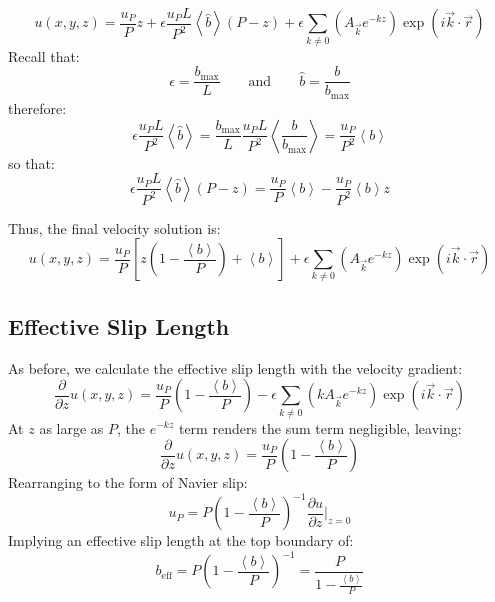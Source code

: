 \documentclass[12pt, a4paper, twoside, openright]{book}
\newcommand{\beff}{\ensuremath{b_{\mathrm{eff}}}}
\newcommand{\bmax}{\ensuremath{b_{\mathrm{max}}}}
\begin{document}
\begin{equation}
u(x,y,z) = \frac{u_P}{P} z
 + \epsilon \frac{u_P L}{P^2} \left< \hat{b} \right> (P - z)
 +  \epsilon \sum_{k \neq 0} 
\left(  A_{\vec{k}} e^{-kz} \right)
\exp(i \vec{k}\cdot \vec{r})
\end{equation}
Recall that:
\begin{equation}
\epsilon = \frac{\bmax}{L} \qquad \text{and} \qquad
\hat{b} = \frac{b}{\bmax}
\end{equation}
therefore:
\begin{equation}
\epsilon \frac{u_P L}{P^2} \left< \hat{b} \right> 
= \frac{\bmax}{L} \frac{u_P L}{P^2} \left< \frac{b}{\bmax} \right> 
= \frac{u_P}{P^2} \left< b \right>
\end{equation}
so that:
\begin{equation}
\epsilon \frac{u_P L}{P^2} \left< \hat{b} \right> (P - z)
= \frac{u_P}{P} \left< b \right> - \frac{u_P}{P^2} \left< b \right> z
\end{equation}


Thus, the final velocity solution is:
\begin{equation}
u(x,y,z) = \frac{u_P}{P} 
\left[ z \left( 1 - \frac{\left< b \right>}{P} \right) + \left< b \right> \right]
 +  \epsilon \sum_{k \neq 0} 
\left(  A_{\vec{k}} e^{-kz} \right)
\exp(i \vec{k}\cdot \vec{r})
\end{equation}



\subsection*{Effective Slip Length}

As before, we calculate the effective slip length with the velocity gradient:
\begin{equation}
\frac{\partial}{\partial z} u(x,y,z) = \frac{u_P}{P} 
\left( 1 - \frac{\left< b \right>}{P} \right)
- \epsilon \sum_{k \neq 0} 
\left( k A_{\vec{k}} e^{-kz} \right)
\exp(i \vec{k}\cdot \vec{r})
\end{equation}
At $z$ as large as $P$, the $e^{-kz}$ term renders the sum term negligible, leaving:
\begin{equation}
\frac{\partial}{\partial z} u(x,y,z) = \frac{u_P}{P} 
\left( 1 - \frac{\left< b \right>}{P} \right)
\end{equation}
Rearranging to the form of Navier slip:
\begin{equation}
u_P = P \left( 1 - \frac{\left< b \right>}{P} \right)^{-1}
 \frac{\partial u}{\partial z} \rvert_{z=0}
\end{equation}
Implying an effective slip length at the top boundary of:
\begin{equation}
\beff = P \left( 1 - \frac{\left< b \right>}{P} \right)^{-1} 
= \frac{P}{1 - \frac{\left< b \right>}{P}}
\end{equation}
\end{document}
